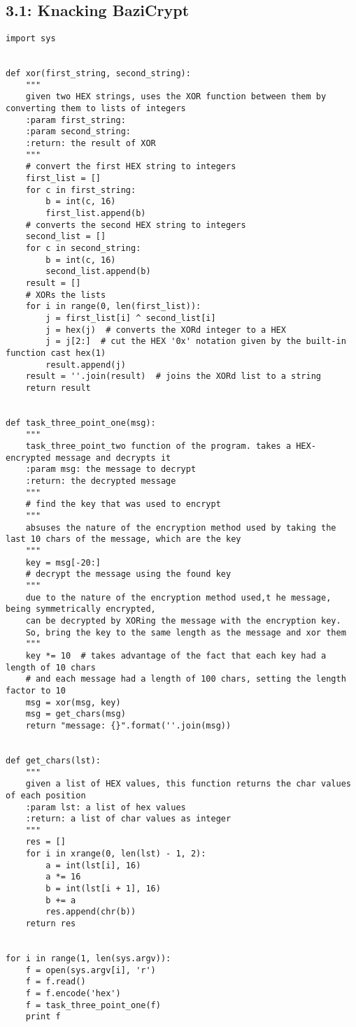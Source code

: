 \documentclass[twoside]{article}
\begin{document}
	\subsection*{3.1: Knacking BaziCrypt}
		\label{bazicrypt}
		\begin{lstlisting}
import sys


def xor(first_string, second_string):
    """
    given two HEX strings, uses the XOR function between them by converting them to lists of integers
    :param first_string:
    :param second_string:
    :return: the result of XOR
    """
    # convert the first HEX string to integers
    first_list = []
    for c in first_string:
        b = int(c, 16)
        first_list.append(b)
    # converts the second HEX string to integers
    second_list = []
    for c in second_string:
        b = int(c, 16)
        second_list.append(b)
    result = []
    # XORs the lists
    for i in range(0, len(first_list)):
        j = first_list[i] ^ second_list[i]
        j = hex(j)  # converts the XORd integer to a HEX
        j = j[2:]  # cut the HEX '0x' notation given by the built-in function cast hex(1)
        result.append(j)
    result = ''.join(result)  # joins the XORd list to a string
    return result


def task_three_point_one(msg):
    """
    task_three_point_two function of the program. takes a HEX-encrypted message and decrypts it
    :param msg: the message to decrypt
    :return: the decrypted message
    """
    # find the key that was used to encrypt
    """
    absuses the nature of the encryption method used by taking the last 10 chars of the message, which are the key
    """
    key = msg[-20:]
    # decrypt the message using the found key
    """
    due to the nature of the encryption method used,t he message, being symmetrically encrypted,
    can be decrypted by XORing the message with the encryption key.
    So, bring the key to the same length as the message and xor them
    """
    key *= 10  # takes advantage of the fact that each key had a length of 10 chars
    # and each message had a length of 100 chars, setting the length factor to 10
    msg = xor(msg, key)
    msg = get_chars(msg)
    return "message: {}".format(''.join(msg))


def get_chars(lst):
    """
    given a list of HEX values, this function returns the char values of each position
    :param lst: a list of hex values
    :return: a list of char values as integer
    """
    res = []
    for i in xrange(0, len(lst) - 1, 2):
        a = int(lst[i], 16)
        a *= 16
        b = int(lst[i + 1], 16)
        b += a
        res.append(chr(b))
    return res


for i in range(1, len(sys.argv)):
    f = open(sys.argv[i], 'r')
    f = f.read()
    f = f.encode('hex')
    f = task_three_point_one(f)
    print f

		\end{lstlisting}
\end{document}
